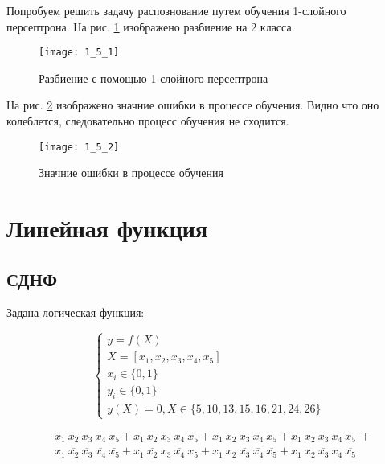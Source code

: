 
Попробуем решить задачу распознование путем обучения 1-слойного персептрона. На рис. \ref{fig:1_5_1} изображено разбиение на 2 класса.

\begin{figure}[H]
\begin{center}
	\texttt{[image: 1\_5\_1]}
	\caption{Разбиение с помощью 1-слойного персептрона}
	\label{fig:1_5_1}
\end{center}
\end{figure}

На рис. \ref{fig:1_5_2} изображено значние ошибки в процессе обучения. Видно что оно колеблется, следовательно процесс обучения не сходится.

\begin{figure}[H]
\begin{center}
	\texttt{[image: 1\_5\_2]}
	\caption{Значние ошибки в процессе обучения}
	\label{fig:1_5_2}
\end{center}
\end{figure}

\section{Линейная функция}

\subsection{СДНФ}

Задана логическая функция:

\begin{equation*}
\begin{cases}
	y = f(X)\\
	X = [x_1, x_2, x_3, x_4, x_5]\\
	x_i \in \{0, 1\}\\
	y_i \in \{0, 1\}\\
	y(X) = 0, X \in \{ 5, 10, 13, 15, 16, 21, 24, 26 \}
\end{cases}
\end{equation*}

\begin{align*}
&\overline{x_1}\ \overline{x_2}\ x_3\ \overline{x_4}\ x_5 +
\overline{x_1}\ x_2\ \overline{x_3}\ x_4\ \overline{x_5} +
\overline{x_1}\ x_2\ x_3\ \overline{x_4}\ x_5 +
\overline{x_1}\ x_2\ x_3\ x_4\ x_5\ + \\
&x_1\ \overline{x_2}\ \overline{x_3}\ \overline{x_4}\ \overline{x_5} +
x_1\ \overline{x_2}\ x_3\ \overline{x_4}\ x_5 +
x_1\ x_2\ \overline{x_3}\ \overline{x_4}\ \overline{x_5} +
x_1\ x_2\ \overline{x_3}\ x_4\ \overline{x_5}
\end{align*}

